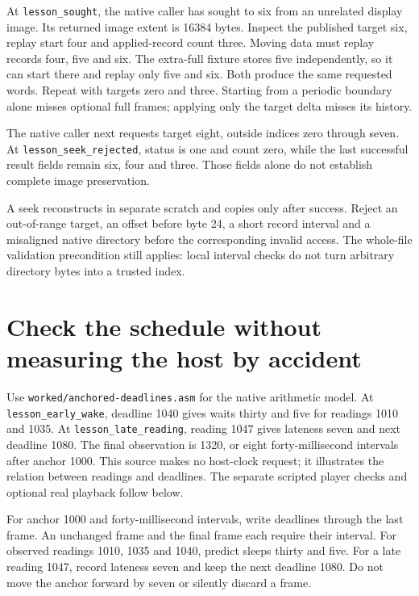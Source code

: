 At \texttt{lesson\_sought}, the native caller has sought to six from an
unrelated display image. Its returned image extent is 16384 bytes. Inspect the
published target six, replay start four and applied-record count three. Moving data must replay records
four, five and six. The extra-full fixture stores five independently, so it can
start there and replay only five and six. Both produce the same requested words.
Repeat with targets zero and three. Starting from a periodic boundary alone
misses optional full frames; applying only the target delta misses its history.

The native caller next requests target eight, outside indices zero through
seven. At \texttt{lesson\_seek\_rejected}, status is one and count zero,
while the last successful result fields remain six, four and three. Those fields
alone do not establish complete image preservation.

A seek reconstructs in separate scratch and copies only after success. Reject
an out-of-range target, an offset before byte 24, a short record interval and
a misaligned native directory before the corresponding invalid access. The
whole-file validation precondition still applies: local interval checks do not
turn arbitrary directory bytes into a trusted index.

\section{Check the schedule without measuring the host by accident}

Use \texttt{worked/anchored-deadlines.asm} for the native arithmetic model.
At \texttt{lesson\_early\_wake}, deadline 1040 gives waits thirty and five
for readings 1010 and 1035. At \texttt{lesson\_late\_reading}, reading
1047 gives lateness seven and next deadline 1080. The final observation is
1320, or eight forty-millisecond intervals after anchor 1000. This source makes
no host-clock request; it illustrates the relation between readings and deadlines.
The separate scripted player checks and optional real playback follow below.

For anchor 1000 and forty-millisecond intervals, write deadlines through the
last frame. An unchanged frame and the final frame each require their interval.
For observed readings 1010, 1035 and 1040, predict sleeps thirty and five.
For a late reading 1047, record lateness seven and keep the next deadline 1080.
Do not move the anchor forward by seven or silently discard a frame.

